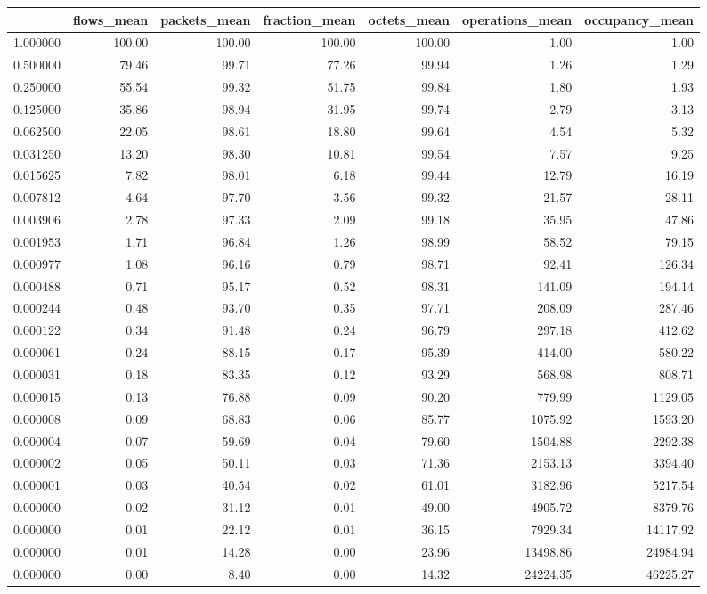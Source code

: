 \begin{tabular}{lrrrrrr}
\toprule
 & flows_mean & packets_mean & fraction_mean & octets_mean & operations_mean & occupancy_mean \\
\midrule
1.000000 & 100.00 & 100.00 & 100.00 & 100.00 & 1.00 & 1.00 \\
0.500000 & 79.46 & 99.71 & 77.26 & 99.94 & 1.26 & 1.29 \\
0.250000 & 55.54 & 99.32 & 51.75 & 99.84 & 1.80 & 1.93 \\
0.125000 & 35.86 & 98.94 & 31.95 & 99.74 & 2.79 & 3.13 \\
0.062500 & 22.05 & 98.61 & 18.80 & 99.64 & 4.54 & 5.32 \\
0.031250 & 13.20 & 98.30 & 10.81 & 99.54 & 7.57 & 9.25 \\
0.015625 & 7.82 & 98.01 & 6.18 & 99.44 & 12.79 & 16.19 \\
0.007812 & 4.64 & 97.70 & 3.56 & 99.32 & 21.57 & 28.11 \\
0.003906 & 2.78 & 97.33 & 2.09 & 99.18 & 35.95 & 47.86 \\
0.001953 & 1.71 & 96.84 & 1.26 & 98.99 & 58.52 & 79.15 \\
0.000977 & 1.08 & 96.16 & 0.79 & 98.71 & 92.41 & 126.34 \\
0.000488 & 0.71 & 95.17 & 0.52 & 98.31 & 141.09 & 194.14 \\
0.000244 & 0.48 & 93.70 & 0.35 & 97.71 & 208.09 & 287.46 \\
0.000122 & 0.34 & 91.48 & 0.24 & 96.79 & 297.18 & 412.62 \\
0.000061 & 0.24 & 88.15 & 0.17 & 95.39 & 414.00 & 580.22 \\
0.000031 & 0.18 & 83.35 & 0.12 & 93.29 & 568.98 & 808.71 \\
0.000015 & 0.13 & 76.88 & 0.09 & 90.20 & 779.99 & 1129.05 \\
0.000008 & 0.09 & 68.83 & 0.06 & 85.77 & 1075.92 & 1593.20 \\
0.000004 & 0.07 & 59.69 & 0.04 & 79.60 & 1504.88 & 2292.38 \\
0.000002 & 0.05 & 50.11 & 0.03 & 71.36 & 2153.13 & 3394.40 \\
0.000001 & 0.03 & 40.54 & 0.02 & 61.01 & 3182.96 & 5217.54 \\
0.000000 & 0.02 & 31.12 & 0.01 & 49.00 & 4905.72 & 8379.76 \\
0.000000 & 0.01 & 22.12 & 0.01 & 36.15 & 7929.34 & 14117.92 \\
0.000000 & 0.01 & 14.28 & 0.00 & 23.96 & 13498.86 & 24984.94 \\
0.000000 & 0.00 & 8.40 & 0.00 & 14.32 & 24224.35 & 46225.27 \\
\bottomrule
\end{tabular}
